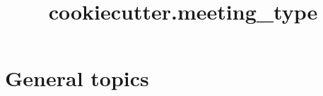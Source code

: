 \documentclass{beamer}
\title{
    {{ cookiecutter.meeting_type }}
}
\begin{document}
\beginframes

\section{General topics}
\end{document}
